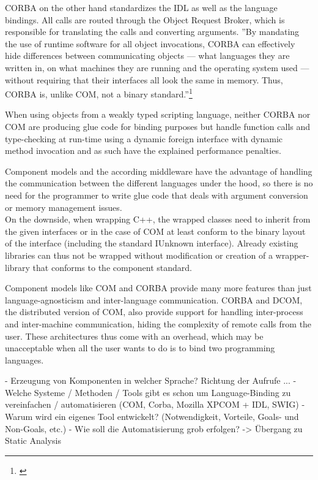 CORBA on the other hand standardizes the IDL as well as the language bindings. All calls are routed through the Object Request Broker, which is responsible for translating the calls and converting arguments. ''By mandating the use of runtime software for all object invocations, CORBA can effectively hide differences between communicating objects — what languages they are written in, on what machines they are running and the operating system used — without requiring that their interfaces all look the same in memory. Thus, CORBA is, unlike COM, not a binary standard.''\footnote{\citep[83]{ComponentTechnology}}

When using objects from a weakly typed scripting language, neither CORBA nor COM are producing glue code for binding purposes but handle function calls and type-checking at run-time using a dynamic foreign interface with dynamic method invocation and as such have the explained performance penalties.

Component models and the according middleware have the advantage of handling the communication between the different languages under the hood, so there is no need for the programmer to write glue code that deals with argument conversion or memory management issues.\\
On the downside, when wrapping C++, the wrapped classes need to inherit from the given interfaces or in the case of COM at least conform to the binary layout of the interface (including the standard IUnknown interface). Already existing libraries can thus not be wrapped without modification or creation of a wrapper-library that conforms to the component standard.


Component models like COM and CORBA provide many more features than just language-agnosticism and inter-language communication. CORBA and DCOM, the distributed version of COM, also provide support for handling inter-process and inter-machine communication, hiding the complexity of remote calls from the user. These architectures thus come with an overhead, which may be unacceptable when all the user wants to do is to bind two programming languages.



  - Erzeugung von Komponenten in welcher Sprache? Richtung der Aufrufe ...
  - Welche Systeme / Methoden / Tools gibt es schon um Language-Binding zu vereinfachen / automatisieren (COM, Corba, Mozilla XPCOM + IDL, SWIG)
  - Warum wird ein eigenes Tool entwickelt? (Notwendigkeit, Vorteile, Goals- und Non-Goals, etc.)
  - Wie soll die Automatisierung grob erfolgen? -> Übergang zu Static Analysis